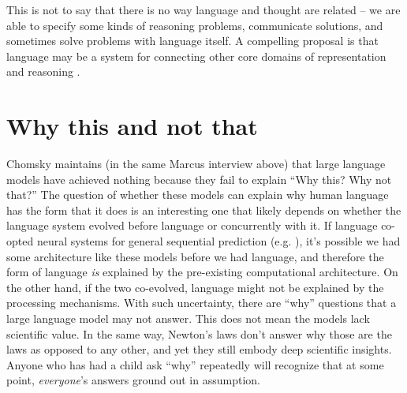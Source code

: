 \documentclass[output=paper,colorlinks,citecolor=brown]{langscibook}
\begin{document}
This is not to say that there is no way language and thought are related -- we are able to specify some kinds of reasoning problems, communicate solutions, and sometimes solve problems with language itself. A compelling proposal is that language may be a system for connecting other core domains of representation and reasoning \citep{spelke2003makes}.

\section{Why this and not that}\largerpage

Chomsky maintains (in the same Marcus interview above) that large language models have achieved nothing because they fail to explain  ``Why this?  Why not that?'' The question of whether these models can explain why human language has the form that it does is an interesting one that likely depends on whether the language system evolved before language or concurrently with it. If language co-opted neural systems for general sequential prediction (e.g. \citealt{christiansen2015language}), it's possible we had some architecture like these models before we had language, and therefore the form of language \textit{is} explained by the pre-existing computational architecture. On the other hand, if the two co-evolved, language might not be explained by the processing mechanisms. With such uncertainty,  there are ``why'' questions that a large language model may not answer. This does not mean the models lack scientific value. In the same way, Newton's laws don't answer why those are the laws as opposed to any other, and yet they still embody deep scientific insights. Anyone who has had a child ask ``why'' repeatedly will recognize that at some point, \textit{everyone}'s answers ground out in assumption. 
\end{document}
